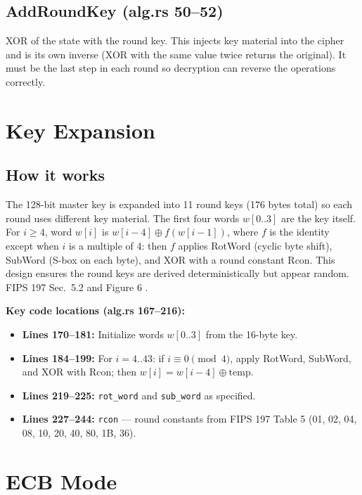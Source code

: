 \documentclass[11pt]{article}
\begin{document}
\subsection*{AddRoundKey (alg.rs 50--52)}

XOR of the state with the round key. This injects key material into the cipher and is its own inverse (XOR with the same value twice returns the original). It must be the last step in each round so decryption can reverse the operations correctly.

\section{Key Expansion}

\subsection*{How it works}

The 128-bit master key is expanded into 11 round keys (176 bytes total) so each round uses different key material. The first four words $w[0..3]$ are the key itself. For $i \geq 4$, word $w[i]$ is $w[i-4] \oplus f(w[i-1])$, where $f$ is the identity except when $i$ is a multiple of 4: then $f$ applies RotWord (cyclic byte shift), SubWord (S-box on each byte), and XOR with a round constant Rcon. This design ensures the round keys are derived deterministically but appear random. FIPS 197 Sec.\ 5.2 and Figure 6 \cite{NIST2001}.

\textbf{Key code locations (alg.rs 167--216):}
\begin{itemize}
    \item \textbf{Lines 170--181:} Initialize words $w[0..3]$ from the 16-byte key.
    \item \textbf{Lines 184--199:} For $i = 4..43$: if $i \equiv 0 \pmod{4}$, apply RotWord, SubWord, and XOR with Rcon; then $w[i] = w[i-4] \oplus \mathrm{temp}$.
    \item \textbf{Lines 219--225:} \texttt{rot\_word} and \texttt{sub\_word} as specified.
    \item \textbf{Lines 227--244:} \texttt{rcon} --- round constants from FIPS 197 Table 5 \cite{NIST2001} (01, 02, 04, 08, 10, 20, 40, 80, 1B, 36).
\end{itemize}

\section{ECB Mode}
\end{document}

